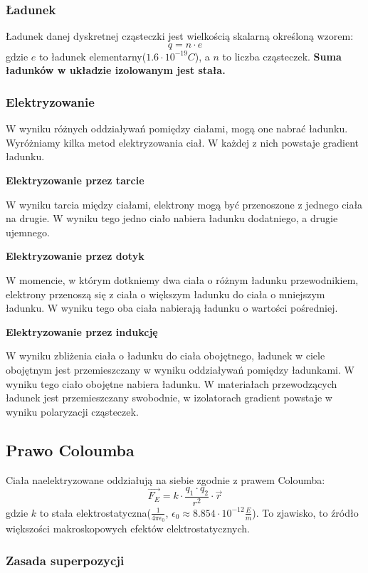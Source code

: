 \documentclass{../notatki}
\begin{document}
\subsubsection{Ładunek}

Ładunek danej dyskretnej cząsteczki jest wielkością skalarną określoną wzorem:
$$
q = n \cdot e
$$
gdzie $e$ to ładunek elementarny($1.6 \cdot 10^{-19} C$), a $n$ to liczba
cząsteczek.
\textbf{Suma ładunków w układzie izolowanym jest stała.}

\subsubsection{Elektryzowanie}

W wyniku różnych oddziaływań pomiędzy ciałami, mogą one nabrać
ładunku. Wyróżniamy
kilka metod elektryzowania ciał. W każdej z nich powstaje gradient ładunku.

\textbf{Elektryzowanie przez tarcie}

W wyniku tarcia między ciałami, elektrony mogą być przenoszone z
jednego ciała na
drugie. W wyniku tego jedno ciało nabiera ładunku dodatniego, a drugie ujemnego.

\textbf{Elektryzowanie przez dotyk}

W momencie, w którym dotkniemy dwa ciała o różnym ładunku
przewodnikiem, elektrony
przenoszą się z ciała o większym ładunku do ciała o mniejszym
ładunku. W wyniku tego
oba ciała nabierają ładunku o wartości pośredniej.

\textbf{Elektryzowanie przez indukcję}

W wyniku zbliżenia ciała o ładunku do ciała obojętnego, ładunek
w ciele obojętnym jest przemieszczany w wyniku oddziaływań pomiędzy
ładunkami. W wyniku tego ciało obojętne nabiera ładunku. W materiałach
przewodzących ładunek jest przemieszczany swobodnie, w izolatorach gradient
powstaje w wyniku polaryzacji cząsteczek.

\subsection{Prawo Coloumba}

Ciała naelektryzowane oddziałują na siebie zgodnie z prawem Coloumba:
$$
\vec{F_E} = k \cdot \frac{q_1 \cdot q_2}{r^2} \cdot \vec{r}
$$
gdzie $k$ to stała elektrostatyczna($\frac{1}{4\pi\epsilon_0}$,
$\epsilon_0\approx8.854\cdot10^{-12}\frac{E}{m}$).
To zjawisko, to źródło większości makroskopowych efektów elektrostatycznych.

\subsubsection{Zasada superpozycji}
\end{document}
